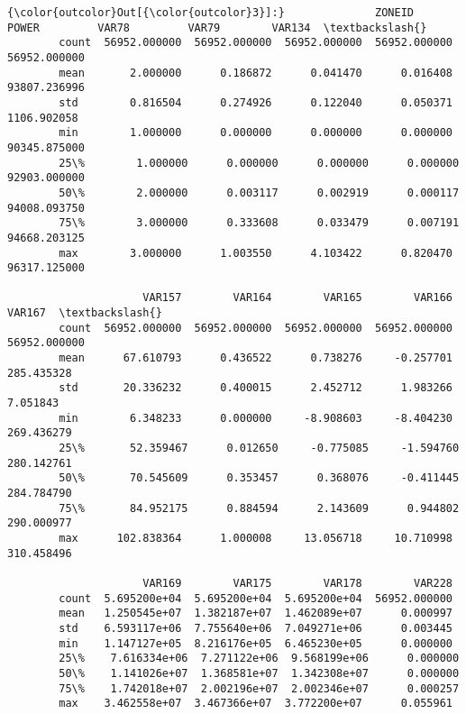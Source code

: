 \documentclass[11pt]{article}
\begin{document}
\begin{Verbatim}[commandchars=\\\{\}]
{\color{outcolor}Out[{\color{outcolor}3}]:}              ZONEID         POWER         VAR78         VAR79        VAR134  \textbackslash{}
        count  56952.000000  56952.000000  56952.000000  56952.000000  56952.000000   
        mean       2.000000      0.186872      0.041470      0.016408  93807.236996   
        std        0.816504      0.274926      0.122040      0.050371   1106.902058   
        min        1.000000      0.000000      0.000000      0.000000  90345.875000   
        25\%        1.000000      0.000000      0.000000      0.000000  92903.000000   
        50\%        2.000000      0.003117      0.002919      0.000117  94008.093750   
        75\%        3.000000      0.333608      0.033479      0.007191  94668.203125   
        max        3.000000      1.003550      4.103422      0.820470  96317.125000   
        
                     VAR157        VAR164        VAR165        VAR166        VAR167  \textbackslash{}
        count  56952.000000  56952.000000  56952.000000  56952.000000  56952.000000   
        mean      67.610793      0.436522      0.738276     -0.257701    285.435328   
        std       20.336232      0.400015      2.452712      1.983266      7.051843   
        min        6.348233      0.000000     -8.908603     -8.404230    269.436279   
        25\%       52.359467      0.012650     -0.775085     -1.594760    280.142761   
        50\%       70.545609      0.353457      0.368076     -0.411445    284.784790   
        75\%       84.952175      0.884594      2.143609      0.944802    290.000977   
        max      102.838364      1.000008     13.056718     10.710998    310.458496   
        
                     VAR169        VAR175        VAR178        VAR228  
        count  5.695200e+04  5.695200e+04  5.695200e+04  56952.000000  
        mean   1.250545e+07  1.382187e+07  1.462089e+07      0.000997  
        std    6.593117e+06  7.755640e+06  7.049271e+06      0.003445  
        min    1.147127e+05  8.216176e+05  6.465230e+05      0.000000  
        25\%    7.616334e+06  7.271122e+06  9.568199e+06      0.000000  
        50\%    1.141026e+07  1.368581e+07  1.342308e+07      0.000000  
        75\%    1.742018e+07  2.002196e+07  2.002346e+07      0.000257  
        max    3.462558e+07  3.467366e+07  3.772200e+07      0.055961  
\end{Verbatim}
            
\end{document}
